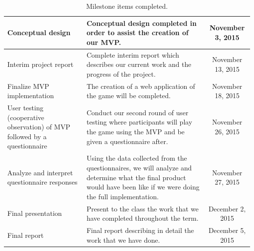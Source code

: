 \documentclass{sigchi}
\begin{document}
\begin{table}[h!]
\begin{tabular}{>{\raggedright}p{4cm}|>{\raggedright}p{6cm}|c}
Conceptual design &
Conceptual design completed in order to assist the creation of our MVP. &
November 3, 2015 \\ \hline

Interim project report &
Complete interim report which describes our current work and the progress of the project. &
November 13, 2015 \\ \hline

Finalize MVP implementation &
The creation of a web application of the game will be completed. &
November 18, 2015 \\ \hline

User testing (cooperative observation) of MVP followed by a questionnaire &
Conduct our second round of user testing where participants will play the game using the MVP and be given a questionnaire after. &
November 26, 2015 \\ \hline

Analyze and interpret questionnaire responses &
Using the data collected from the questionnaires, we will analyze and determine what the final product would have been like if we were doing the full implementation. &
November 27, 2015 \\ \hline

Final presentation &
Present to the class the work that we have completed throughout the term. &
December 2, 2015 \\ \hline

Final report &
Final report describing in detail the work that we have done. &
December 5, 2015 \\ \hline


\end{tabular}
\caption{Milestone items completed.}
\label{tab:milestones}
\end{table}



\label{apx:interview-responses}
\end{document}
